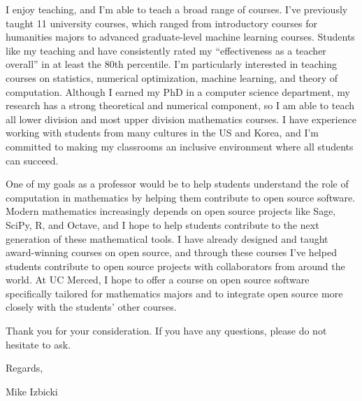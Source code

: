 \documentclass[12pt]{article}
\begin{document}
\noindent
I enjoy teaching,
and I'm able to teach a broad range of courses.
I've previously taught 11 university courses,
which ranged from introductory courses for humanities majors to advanced graduate-level machine learning courses.
Students like my teaching and have consistently rated my ``effectiveness as a teacher overall'' in at least the 80th percentile.
I'm particularly interested in teaching courses on statistics, numerical optimization, machine learning, and theory of computation.
Although I earned my PhD in a computer science department,
my research has a strong theoretical and numerical component,
so I am able to teach all lower division and most upper division mathematics courses.
I have experience working with students from many cultures in the US and Korea,
and I'm committed to making my classrooms an inclusive environment where all students can succeed.

\noindent
One of my goals as a professor would be to help students understand the role of computation in mathematics by helping them contribute to open source software.
Modern mathematics increasingly depends on open source projects like Sage, SciPy, R, and Octave,
and I hope to help students contribute to the next generation of these mathematical tools.
I have already designed and taught award-winning courses on open source,
and through these courses I've helped students contribute to open source projects with collaborators from around the world.
At UC Merced, I hope to offer a course on open source software specifically tailored for mathematics majors
and to integrate open source more closely with the students' other courses.

\noindent
Thank you for your consideration.
If you have any questions,
please do not hesitate to ask.

\noindent
Regards,

\vspace{-0.10in}
\noindent
Mike Izbicki
\end{document}
